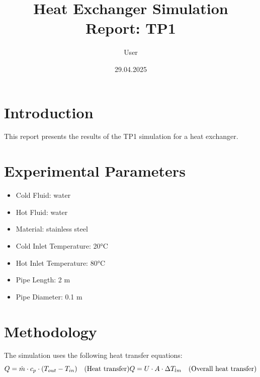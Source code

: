 \documentclass[12pt]{article}
\title{Heat Exchanger Simulation Report: TP1}
\author{User}
\date{29.04.2025}
\begin{document}
\maketitle
\tableofcontents

\section{Introduction}
This report presents the results of the TP1 simulation for a heat exchanger.

\section{Experimental Parameters}
\begin{itemize}
    \setlength\itemsep{-0.5em}
    \item Cold Fluid: water
    \item Hot Fluid: water
    \item Material: stainless steel
    \item Cold Inlet Temperature: 20°C
    \item Hot Inlet Temperature: 80°C
    \item Pipe Length: 2 m
    \item Pipe Diameter: 0.1 m
\end{itemize}\n
\section{Methodology}
The simulation uses the following heat transfer equations:
\begin{equation}\label{eq:tp1_heat_transfer}

    Q = \dot{m} \cdot c_p \cdot (T_{out} - T_{in}) \quad \text{(Heat transfer)} \\
    Q = U \cdot A \cdot \Delta T_{lm} \quad \text{(Overall heat transfer)}
    
\end{equation}\n
\end{document}
